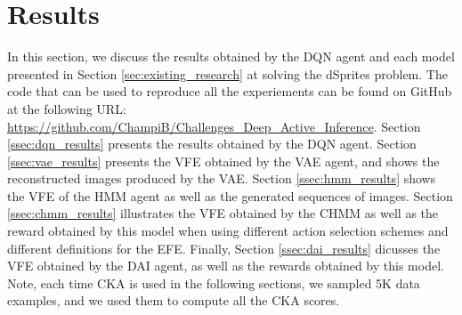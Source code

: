\documentclass[twoside,11pt]{article}
\begin{document}
\section{Results} \label{sec:results}

In this section, we discuss the results obtained by the DQN agent and each model presented in Section \ref{sec:existing_research} at solving the dSprites problem. The code that can be used to reproduce all the experiements can be found on GitHub at the following URL: \url{https://github.com/ChampiB/Challenges_Deep_Active_Inference}. Section \ref{ssec:dqn_results} presents the results obtained by the DQN agent. Section \ref{ssec:vae_results} presents the VFE obtained by the VAE agent, and shows the reconstructed images produced by the VAE. Section \ref{ssec:hmm_results} shows the VFE of the HMM agent as well as the generated sequences of images. Section \ref{ssec:chmm_results} illustrates the VFE obtained by the CHMM as well as the reward obtained by this model when using different action selection schemes and different definitions for the EFE. Finally, Section \ref{ssec:dai_results} dicusses the VFE obtained by the DAI agent, as well as the rewards obtained by this model. Note, each time CKA is used in the following sections, we sampled 5K data examples, and we used them to compute all the CKA scores. 
\end{document}
